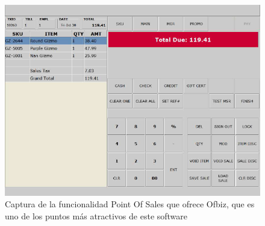 \begin{frame}
\begin{figure}[H]
	\centering
	\includegraphics[width=0.9\linewidth]{img/posOfbiz.png}
	\caption{Captura de la funcionalidad Point Of Sales que ofrece Ofbiz, que es uno de los puntos más atractivos de este software}
\end{figure}

\end{frame}

